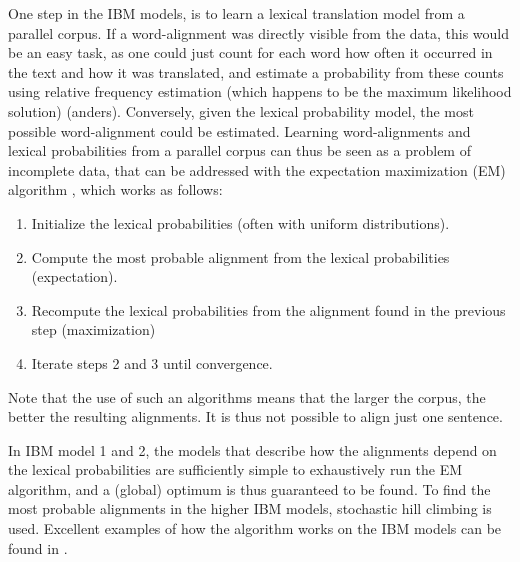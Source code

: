 \documentclass{report}
\theoremstyle{break}
\begin{document}
One step in the IBM models, is to learn a lexical translation model from a parallel corpus. If a word-alignment was directly visible from the data, this would be an easy task, as one could just count for each word how often it occurred in the text and how it was translated, and estimate a probability from these counts using relative frequency estimation (which happens to be the maximum likelihood solution) (anders). Conversely, given the lexical probability model, the most possible word-alignment could be estimated. Learning word-alignments and lexical probabilities from a parallel corpus can thus be seen as a problem of incomplete data, that can be addressed with the expectation maximization (EM) algorithm \citep{dempster1977maximum}, which works as follows:\begin{enumerate}
\item Initialize the lexical probabilities (often with uniform distributions).
\item Compute the most probable alignment from the lexical probabilities (expectation).
\item Recompute the lexical probabilities from the alignment found in the previous step (maximization)
\item Iterate steps 2 and 3 until convergence.
\end{enumerate}

\noindent Note that the use of such an algorithms means that the larger the corpus, the better the resulting alignments. It is thus not possible to align just one sentence.

In IBM model 1 and 2, the models that describe how the alignments depend on the lexical probabilities are sufficiently simple to exhaustively run the EM algorithm, and a (global) optimum is thus guaranteed to be found. To find the most probable alignments in the higher IBM models, stochastic hill climbing is used. Excellent examples of how the algorithm works on the IBM models can be found in \cite[p88-113]{koehn2008statistical}.
\end{document}
